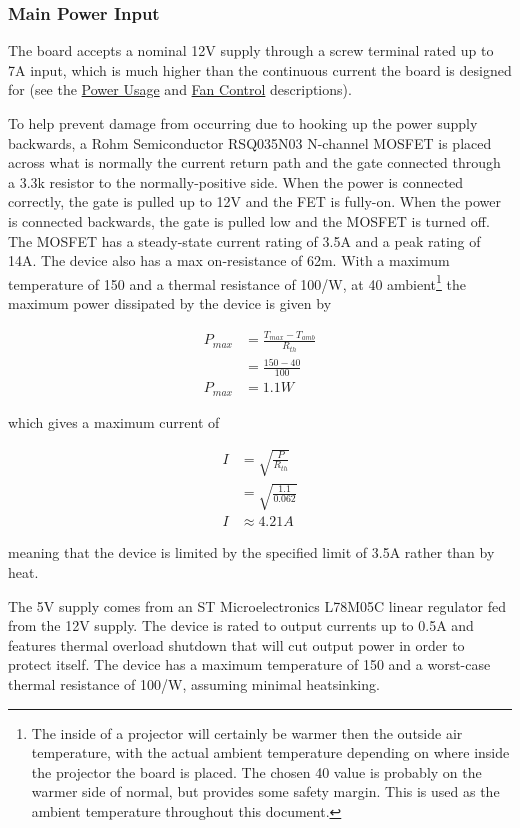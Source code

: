 \documentclass{article}
\begin{document}
\subsubsection{Main Power Input} \label{sssec:MainPower}
The board accepts a nominal 12V supply through a screw terminal rated up to 7A input, which is much
higher than the continuous current the board is designed for (see the
\hyperref[ssec:PowerUsage]{Power Usage} and \hyperref[sssec:FanControl]{Fan Control} descriptions).

To help prevent damage from occurring due to hooking up the power supply backwards, a Rohm
Semiconductor RSQ035N03 N-channel MOSFET is placed across what is normally the current return path
and the gate connected through a 3.3k\textOmega{} resistor to the normally-positive side.  When the
power is connected correctly, the gate is pulled up to 12V and the FET is fully-on.  When the power
is connected backwards, the gate is pulled low and the MOSFET is turned off.  The MOSFET has a
steady-state current rating of 3.5A and a peak rating of 14A.  The device also has a max
on-resistance of 62m\textOmega{}.  With a maximum temperature of 150\textcelsius{} and a thermal
resistance of 100\textcelsius{}/W, at 40\textcelsius{} ambient\footnote{The inside of a projector
  will certainly be warmer then the outside air temperature, with the actual ambient temperature
  depending on where inside the projector the board is placed.  The chosen 40\textcelsius{} value is
  probably on the warmer side of normal, but provides some safety margin.  This is used as the
  ambient temperature throughout this document.} the maximum power dissipated by the device is given
by

\begin{align*}
    P_{max} &= \frac{T_{max}-T_{amb}}{R_{th}} \\
    &= \frac{150 - 40}{100} \\
    P_{max} &= 1.1W
\end{align*}

which gives a maximum current of

\begin{align*}
    I &= \sqrt{\frac{P}{R_{th}}} \\
    &= \sqrt{\frac{1.1}{0.062}} \\
    I &\approx 4.21A
\end{align*}

meaning that the device is limited by the specified limit of 3.5A rather than by heat.

The 5V supply comes from an ST Microelectronics L78M05C linear regulator fed from the 12V supply.
The device is rated to output currents up to 0.5A and features thermal overload shutdown that will
cut output power in order to protect itself.  The device has a maximum temperature of
150\textcelsius{} and a worst-case thermal resistance of 100\textcelsius{}/W, assuming minimal
heatsinking.
\end{document}
